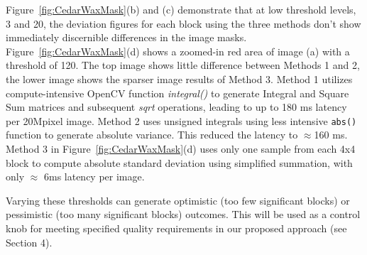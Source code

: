 \documentclass[journal]{IEEEtran}
\begin{document}
Figure~\ref{fig:CedarWaxMask}(b) and (c) demonstrate that at low threshold levels, 3 and 20, the deviation figures for each block using the three methods don't show immediately discernible differences in the image masks.  Figure~\ref{fig:CedarWaxMask}(d) shows a zoomed-in red area of image (a) with a threshold of 120. The top image shows little difference between Methods 1 and 2, the lower image shows the sparser image results of Method 3.
Method 1 utilizes compute-intensive OpenCV function \textit{integral()} to generate Integral and Square Sum matrices and  subsequent \textit{sqrt} 
operations, leading to up to 180 ms latency per 20Mpixel image. Method 2 uses unsigned integrals using less intensive \texttt{abs()} function to generate absolute variance.
This reduced the latency to $\approx$160 ms. Method 3 in Figure~\ref{fig:CedarWaxMask}(d) uses only one sample from each 4x4 block to compute absolute standard deviation using simplified summation, with only $\approx$ 6ms latency per image. %

Varying these thresholds can generate optimistic (too few significant blocks) or pessimistic (too many significant blocks) outcomes. This will be used as a control knob for meeting specified quality requirements in our proposed approach (see Section 4). 
\end{document}
